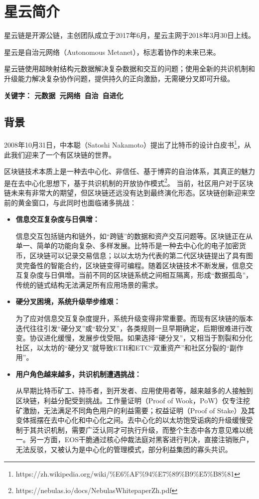 
\section{星云简介}

星云链是开源公链，主创团队成立于2017年6月，星云主网于2018年3月30日上线。

星云是自治元网络（Autonomous Metanet），标志着协作的未来已来。

星云链使用超映射结构元数据解决复杂数据和交互的问题；使用全新的共识机制和升级能力解决复杂协作问题，提供持久的正向激励，无需硬分叉即可升级。

\textbf{关键字： 元数据\ 元网络\ 自治\ 自进化}

\subsection{背景}
2008年10⽉31⽇，中本聪（Satoshi Nakamoto）提出了⽐特币的设计⽩皮书\footnote{https://zh.wikipedia.org/wiki/\%E6\%AF\%94\%E7\%89\%B9\%E5\%B8\%81}，从此我们迎来了一个有区块链的世界。

区块链技术本质上是⼀种去中心化、⾮信任、基于博弈的⾃治体系，其真正的魅力是在去中⼼化思想下，基于共识机制的开放协作模式\footnote{https://nebulas.io/docs/NebulasWhitepaperZh.pdf}。
当前，社区⽤户对于区块链未来有⾮常大的期望，但区块链还远没有达到最终演化形态。区块链创新迎来空前的黄金窗口，与此同时也面临诸多挑战：

\begin{itemize}
\item \textbf{信息交互复杂度与日俱增：}

信息交互包括链内和链外，如“跨链”的数据和资产交互问题等。区块链正在从单⼀、简单的功能向复杂、多样发展。比特币是一种去中心化的电子加密货币，区块链可以记录交易信息；以以太坊为代表的第二代区块链提出了具有图灵完备性的智能合约，区块链变得可编程。随着区块链技术不断发展，信息交互复杂度与日俱增。当前不同的区块链系统之间相互隔离，形成“数据孤岛”，传统的链式结构无法满足所有应用场景的需求。

\item \textbf{硬分叉困境，系统升级举步维艰：}

为了应对信息交互复杂度提升，系统升级变得非常重要。而现有区块链的版本迭代往往引发“硬分叉”或“软分叉”，各类规则一旦早期确定，后期很难进行改变。协议进化缓慢，发展步伐受阻。如果选择“硬分叉”，又相当于割裂和分化社区，以太坊的“硬分叉”就导致ETH和ETC“双重资产”和社区分裂的“副作用”。

\item \textbf{用户角色越来越多，共识机制遭遇挑战：}

从早期比特币矿工、持币者，到开发者、应用使用者等，越来越多的人接触到区块链，利益分配受到挑战。工作量证明（Proof of Wook，PoW）仅专注挖矿激励，无法满足不同角色用户的利益需要；权益证明（Proof of Stake）及其变体摇摆在去中心化和中心化之间。去中心化的以太坊饱受诟病的升级缓慢受制于其共识机制，需要广泛认同才可执行升级，而整个生态中各方意见难以统一。另一方面，EOS干脆通过核心仲裁法庭对黑客进行判决，直接注销账户，无法反驳，又被认为是中心化的管理模式，部分利益集团的寡头共识。
\end{itemize}

